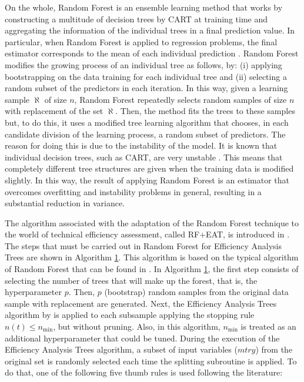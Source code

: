 On the whole, Random Forest \citep{breiman2001} is an ensemble learning
method that works by constructing a multitude of decision trees by CART
\citep{breiman1984} at training time and aggregating the information of
the individual trees in a final prediction value. In particular, when
Random Forest is applied to regression problems, the final estimator
corresponds to the mean of each individual prediction
\citep{breiman2001}. Random Forest modifies the growing process of an
individual tree as follows, by: (i) applying bootstrapping on the data
training for each individual tree and (ii) selecting a random subset of
the predictors in each iteration. In this way, given a learning sample
\(\aleph\) of size \(n\), Random Forest repeatedly selects random
samples of size \(n\) with replacement of the set \(\aleph\). Then, the
method fits the trees to these samples but, to do this, it uses a
modified tree learning algorithm that chooses, in each candidate
division of the learning process, a random subset of predictors. The
reason for doing this is due to the instability of the model. It is
known that individual decision trees, such as CART, are very unstable
\citep{berk2016}. This means that completely different tree structures
are given when the training data is modified slightly. In this way, the
result of applying Random Forest is an estimator that overcomes
overfitting and instability problems in general, resulting in a
substantial reduction in variance.

The algorithm associated with the adaptation of the Random Forest
technique to the world of technical efficiency assessment, called
RF+EAT, is introduced in \citet{esteve2021}. The steps that must be
carried out in Random Forest for Efficiency Analysis Trees are shown in
Algorithm \hyperref[alg:algo1]{1}. This algorithm is based on the
typical algorithm of Random Forest that can be found in
\citet{kuhn2013}. In Algorithm \hyperref[alg:algo1]{1}, the first step
consists of selecting the number of trees that will make up the forest,
that is, the hyperparameter \(p\). Then, \(p\) (bootstrap) random
samples from the original data sample with replacement are generated.
Next, the Efficiency Analysis Trees algorithm by \citet{esteve2020} is
applied to each subsample applying the stopping rule
\(n\left(t\right)\le n_{\min}\), but without pruning. Also, in this
algorithm, \(n_{\min}\) is treated as an additional hyperparameter that
could be tuned. During the execution of the Efficiency Analysis Trees
algorithm, a subset of input variables (\(mtry\)) from the original set
is randomly selected each time the splitting subroutine is applied. To
do that, one of the following five thumb rules is used following the
literature:

